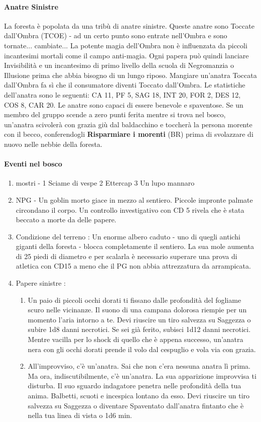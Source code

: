 \documentclass{article}
\begin{document}
\paragraph{Anatre Sinistre} La foresta è popolata da una tribù di anatre sinistre. Queste anatre sono Toccate dall'Ombra (TCOE) - ad un certo punto sono entrate nell'Ombra e sono tornate... cambiate... La potente magia dell'Ombra non è influenzata da piccoli incantesimi mortali come il campo anti-magia. Ogni papera può quindi lanciare Invisibilità e un incantesimo di primo livello della scuola di Negromanzia o Illusione prima che abbia bisogno di un lungo riposo. Mangiare un'anatra Toccata dall'Ombra fa sì che il consumatore diventi Toccato dall'Ombra.
Le statistiche dell'anatra sono le seguenti: CA 11, PF 5, SAG 18, INT 20, FOR 2, DES 12, COS 8,
CAR 20.
Le anatre sono capaci di essere benevole e spaventose. Se un membro del gruppo scende a zero punti ferita mentre si trova nel bosco, un'anatra scivolerà con grazia giù dal baldacchino e toccherà la persona morente con il becco, conferendogli \textbf{Risparmiare i morenti} (BR) prima di svolazzare di nuovo nelle nebbie della foresta.
\paragraph{Eventi nel bosco}
\begin{enumerate}
    \item mostri - 1 Sciame di vespe 2 Ettercap 3 Un lupo mannaro
    \item NPG - Un goblin morto giace in mezzo al sentiero. Piccole impronte palmate circondano il corpo. Un controllo investigativo con CD 5 rivela che è stata beccato a morte da delle papere.
    \item Condizione del terreno : Un enorme albero caduto - uno di quegli antichi giganti della foresta - blocca completamente il sentiero. La sua mole aumenta di 25 piedi di diametro e per scalarla è necessario superare una prova di atletica con CD15 a meno che il PG non abbia attrezzatura da arrampicata.
    \item Papere sinistre :
        \begin{enumerate}
            \item     Un paio di piccoli occhi dorati ti fissano dalle profondità del fogliame scuro nelle vicinanze. Il suono di una campana dolorosa riempie per un momento l'aria intorno a te. Devi riuscire un tiro salvezza su Saggezza o subire 1d8 danni necrotici. Se sei già ferito, subisci 1d12 danni necrotici. Mentre vacilla per lo shock di quello che è appena successo, un'anatra nera con gli occhi dorati prende il volo dal cespuglio e vola via con grazia.
            \item All'improvviso, c'è un'anatra. Sai che non c'era nessuna anatra lì prima. Ma ora, indiscutibilmente, c'è un'anatra. La sua apparizione improvvisa ti disturba. Il suo sguardo indagatore penetra nelle profondità della tua anima. Balbetti, scuoti e incespica lontano da esso. Devi riuscire un tiro salvezza su Saggezza o diventare Spaventato dall'anatra fintanto che è nella tua linea di vista o 1d6 min.
        \end{enumerate}
\end{enumerate}
\end{document}
